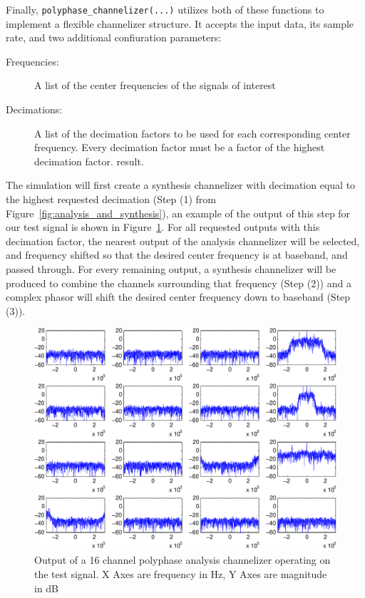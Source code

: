 \documentclass[12pt]{report}
\begin{document}
Finally, \texttt{polyphase\_channelizer(...)} utilizes both of these functions to
implement a flexible channelizer structure.  It accepts the input data, its
sample rate, and two additional confiuration parameters:
\begin{description}
    \item[Frequencies:] A list of the center frequencies of the signals of interest
    \item[Decimations:] A list of the decimation factors to be used for each
        corresponding center frequency.  Every decimation factor must be
        a factor of the highest decimation factor.
    result.
\end{description}
The simulation will first create a synthesis channelizer with decimation equal
to the highest requested decimation (Step (1) from
Figure~\ref{fig:analysis_and_synthesis}), an example of the output of this step
for our test signal is shown in Figure~\ref{fig:polyphase_splits}.  For all
requested outputs with this decimation factor, the nearest output of the
analysis channelizer will be selected, and frequency shifted so that the
desired center frequency is at baseband, and passed through. For every
remaining output, a synthesis channelizer will be produced to combine the
channels surrounding that frequency (Step (2)) and a complex phasor will shift
the desired center frequency down to baseband (Step (3)).

\begin{figure}[ht!]
    \includegraphics[width=\textwidth]{polyphase_splits}%
    \caption{Output of a 16 channel polyphase analysis channelizer operating on
             the test signal. X Axes are frequency in Hz, Y Axes are magnitude
             in dB}
    \label{fig:polyphase_splits}
\end{figure}
\end{document}

